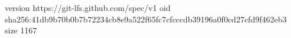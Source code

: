 version https://git-lfs.github.com/spec/v1
oid sha256:41db9b70b0b7b72234cb8e9a522f65fc7cfcccdb39196a0f0cd27cfd9f462eb3
size 1167

